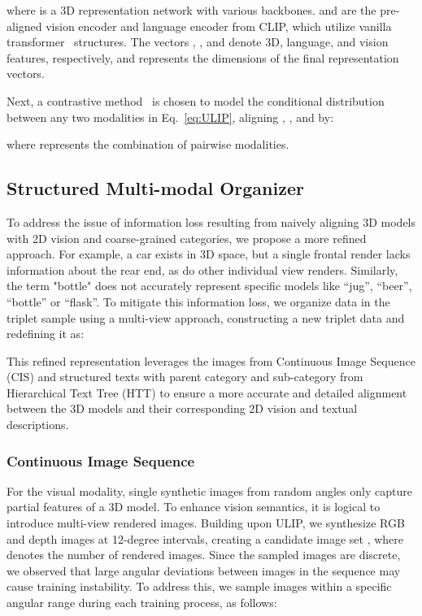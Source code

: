 \documentclass[sigconf]{acmart}
\begin{document}
where  is a 3D representation network with various backbones.  and  are the pre-aligned vision encoder and language encoder from CLIP, which utilize vanilla transformer~\cite{vaswani2017attention} structures. The vectors , , and  denote 3D, language, and vision features, respectively, and  represents the dimensions of the final representation vectors.

Next, a contrastive method~\cite{radford2021learning} is chosen to model the conditional distribution between any two modalities in Eq.~\ref{eq:ULIP}, aligning , , and  by:

where  represents the combination of pairwise modalities. 

\subsection{Structured Multi-modal Organizer \label{sec:SMO}}

To address the issue of information loss resulting from naively aligning 3D models  with 2D vision and coarse-grained categories, we propose a more refined approach. For example, a car exists in 3D space, but a single frontal render lacks information about the rear end, as do other individual view renders. Similarly, the term "bottle" does not accurately represent specific models like ``jug'', ``beer'', ``bottle'' or ``flask''. To mitigate this information loss, we organize data in the triplet sample  using a multi-view approach, constructing a new triplet data and redefining it as:

This refined representation leverages the  images from Continuous Image Sequence (CIS) and structured texts with parent category and sub-category from Hierarchical Text Tree (HTT) to ensure a more accurate and detailed alignment between the 3D models and their corresponding 2D vision and textual descriptions.







\subsubsection{\textbf{Continuous Image Sequence}}
For the visual modality, single synthetic images from random angles only capture partial features of a 3D model. To enhance vision semantics, it is logical to introduce multi-view rendered images.
Building upon ULIP, we synthesize RGB and depth images at 12-degree intervals, creating a candidate image set , where  denotes the number of rendered images. Since the sampled images are discrete, we observed that large angular deviations between images in the sequence may cause training instability. To address this, we sample  images within a specific angular range during each training process, as follows:
\end{document}
